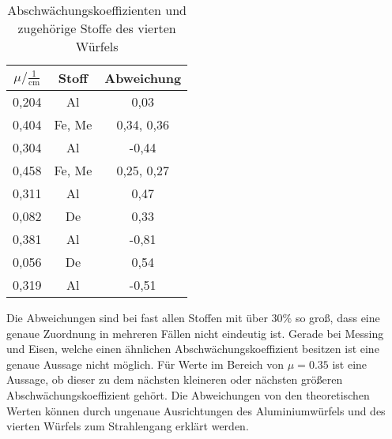 \begin{table}[H]
  \centering
  \caption{Abschwächungskoeffizienten und zugehörige Stoffe des vierten Würfels}
  \label{tab:abw}
  \begin{tabular}{c c c}
    \toprule
    $\mu/ \mathrm{\frac{1}{cm}}$ & Stoff & Abweichung   \\
    \midrule
    0,204      &  Al     &   0,03    \\
    0,404      &  Fe, Me &   0,34, 0,36    \\
    0,304      &  Al     &  -0,44    \\
    0,458      &  Fe, Me &   0,25, 0,27    \\
    0,311      &  Al     &   0,47    \\
    0,082      &  De     &   0,33    \\
    0,381      &  Al     &  -0,81    \\
    0,056      &  De     &   0,54   \\
    0,319      &  Al     &  -0,51  \\
    \bottomrule
  \end{tabular}
\end{table}

Die Abweichungen sind bei fast allen Stoffen mit über $30\%$ so groß, dass
eine genaue Zuordnung in mehreren Fällen nicht eindeutig ist. Gerade bei Messing und
Eisen, welche einen ähnlichen Abschwächungskoeffizient besitzen ist eine genaue
Aussage nicht möglich. Für Werte im Bereich von $\mu = 0.35$ ist eine Aussage, ob
dieser zu dem nächsten kleineren oder nächsten größeren Abschwächungskoeffizient
gehört. Die Abweichungen von den theoretischen Werten können durch ungenaue Ausrichtungen des
Aluminiumwürfels und des vierten Würfels zum Strahlengang erklärt werden.
